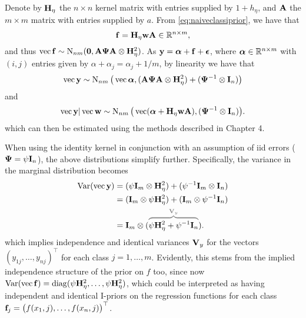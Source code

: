 Denote by ${\mathbf H}_\eta$ the $n\times n$ kernel matrix with entries supplied by $1 + h_\eta$, and ${\mathbf A}$ the $m\times m$ matrix with entries supplied by $a$.
From \cref{eq:naiveclassiprior}, we have that 
\[
  {\mathbf f} = {\mathbf H}_\eta {\mathbf w} {\mathbf A} \in \mathbb{R}^{n \times m},
\]
and thus $\operatorname{vec} {\mathbf f} \sim \operatorname{N}_{nm}({\mathbf 0}, {\mathbf A}{\bm\Psi}{\mathbf A} \otimes {\mathbf H}_\eta^2)$.
As ${\mathbf y} = {\bm\alpha} + {\mathbf f} + {\bm\epsilon}$, where ${\bm\alpha} \in \mathbb{R}^{n\times m}$ with $(i,j)$ entries given by $\alpha + \alpha_j = \alpha_j + 1/m$, by linearity we have that 
\begin{equation}
  \operatorname{vec} {\mathbf y} \sim \operatorname{N}_{nm}\big(\operatorname{vec} {\bm\alpha}, ({\mathbf A}{\bm\Psi}{\mathbf A} \otimes {\mathbf H}_\eta^2) + ({\bm\Psi}^{-1} \otimes {\mathbf I}_n) \big)
\end{equation}
and
\begin{equation}
  \operatorname{vec} {\mathbf y}|\operatorname{vec} {\mathbf w} \sim \operatorname{N}_{nm}\big(\operatorname{vec} ({\bm\alpha}  + {\mathbf H}_\eta {\mathbf w} {\mathbf A}), ({\bm\Psi}^{-1} \otimes {\mathbf I}_n) \big).
\end{equation}
which can then be estimated using the methods described in Chapter 4.

When using the identity kernel in conjunction with an assumption of iid errors (${\bm\Psi} = \psi{\mathbf I}_n$), the above distributions simplify further.
Specifically, the variance in the marginal distribution becomes 
\begin{align*}
  \Var(\vecc \by) 
  &= (\psi\bI_m \otimes \bH_\eta^2) + (\psi^{-1}\bI_m \otimes \bI_n) \\
  &= (\bI_m \otimes \psi\bH_\eta^2) + (\bI_m \otimes \psi^{-1}\bI_n) \\
  &= \bI_m \otimes (\myoverbrace{\psi\bH_\eta^2 + \psi^{-1}\bI_n}{\bV_y}).
\end{align*}
which implies independence and identical variances ${\mathbf V}_y$ for the vectors $(y_{1j},\dots,y_{nj})^\top$ for each class $j=1,\dots,m$.
Evidently, this stems from the implied independence structure of the prior on $f$ too, since now $\operatorname{Var} (\operatorname{vec} {\mathbf f}) = \operatorname{diag}(\psi{\mathbf H}_\eta^2,\dots, \psi{\mathbf H}_\eta^2)$, which could be interpreted as having independent and identical I-priors on the regression functions for each class ${\mathbf f}_j = \big(f(x_1,j),\dots,f(x_n,j)\big)^\top$.

